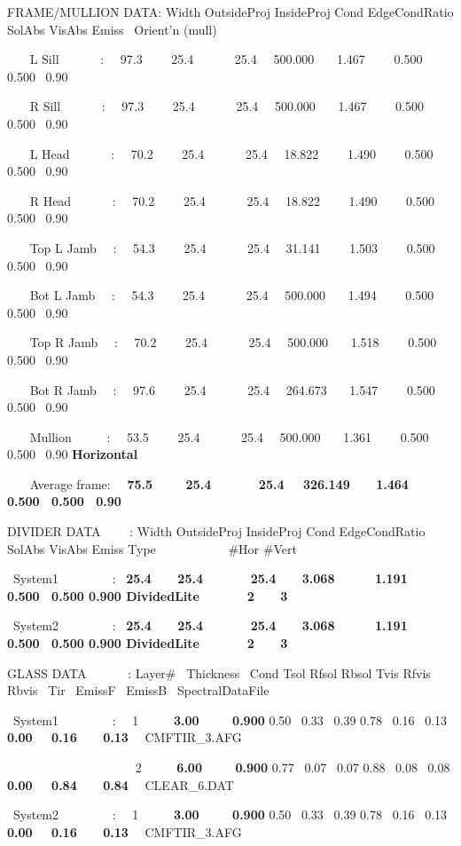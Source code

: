 FRAME/MULLION DATA: Width OutsideProj InsideProj Cond EdgeCondRatio SolAbs VisAbs Emiss~ Orient'n (mull)

~~~ L Sill~~~~~~ :~~ 97.3~~~~ 25.4~~~~~~ 25.4~~ 500.000~~~ 1.467~~~~ 0.500~ 0.500~ 0.90

~~~ R Sill~~~~~~ :~~ 97.3~~~~ 25.4~~~~~~ 25.4~~ 500.000~~~ 1.467~~~~ 0.500~ 0.500~ 0.90

~~~ L Head~~~~~~ :~~ 70.2~~~~ 25.4~~~~~~ 25.4~~ 18.822~~~~ 1.490~~~~ 0.500~ 0.500~ 0.90

~~~ R Head~~~~~~ :~~ 70.2~~~~ 25.4~~~~~~ 25.4~~ 18.822~~~~ 1.490~~~~ 0.500~ 0.500~ 0.90

~~~ Top L Jamb~~ :~~ 54.3~~~~ 25.4~~~~~~ 25.4~~ 31.141~~~~ 1.503~~~~ 0.500~ 0.500~ 0.90

~~~ Bot L Jamb~~ :~~ 54.3~~~~ 25.4~~~~~~ 25.4~~ 500.000~~~ 1.494~~~~ 0.500~ 0.500~ 0.90

~~~ Top R Jamb~~ :~~ 70.2~~~~ 25.4~~~~~~ 25.4~~ 500.000~~~ 1.518~~~~ 0.500~ 0.500~ 0.90

~~~ Bot R Jamb~~ :~~ 97.6 ~~~~25.4~~~~~~ 25.4~~ 264.673~~~ 1.547~~~~ 0.500~ 0.500~ 0.90

~~~ Mullion~~~~~ :~~ 53.5~~~~ 25.4~~~~~~ 25.4~~ 500.000~~~ 1.361~~~~ 0.500~ 0.500~ 0.90 \textbf{Horizontal}

~~~ Average frame:~~ \textbf{75.5~~~~ 25.4~~~~~~ 25.4~~ 326.149~~~ 1.464~~~~ 0.500~ 0.500~ 0.90}

DIVIDER DATA~~~~ : Width OutsideProj InsideProj Cond EdgeCondRatio SolAbs VisAbs Emiss Type~~~~~~~~~~~ \#Hor \#Vert

~System1~~~~~~~~ :~ \textbf{25.4~~~ 25.4~~~~~~ 25.4~~~ 3.068~~~~~ 1.191~~~~ 0.500~ 0.500 0.900 DividedLite~~~~~~ 2~~~ 3}

~System2~~~~~~~~ :~ \textbf{25.4~~~ 25.4~~~~ ~~25.4~~~ 3.068~~~~~ 1.191~~~~ 0.500~ 0.500 0.900 DividedLite~~~~~~ 2~~~ 3}

GLASS DATA~~~~~~ : Layer\#~ Thickness~ Cond Tsol Rfsol Rbsol Tvis Rfvis Rbvis~ Tir~ EmissF~ EmissB~ SpectralDataFile

~System1~~~~~~~~ :~~ 1~~~~~ \textbf{3.00~~~~ 0.900} 0.50~ 0.33~ 0.39 0.78~ 0.16~ 0.13 \textbf{0.00~~ 0.16~~~ 0.13}~~ CMFTIR\_3.AFG

~~~~~~~~~~~~~~~~~~~~ 2~~~~~ \textbf{6.00~~~~ 0.900} 0.77~ 0.07~ 0.07 0.88~ 0.08~ 0.08 \textbf{0.00~~ 0.84~~~ 0.84}~~ CLEAR\_6.DAT

~System2~~~~~~~~ :~~ 1~~~~~ \textbf{3.00~~~~ 0.900} 0.50~ 0.33~ 0.39 0.78~ 0.16~ 0.13 \textbf{0.00~~ 0.16~~~ 0.13}~~ CMFTIR\_3.AFG

